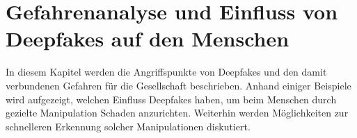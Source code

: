 \section{Gefahrenanalyse und Einfluss von Deepfakes auf den Menschen}
In diesem Kapitel werden die Angriffspunkte von Deepfakes und den damit verbundenen Gefahren für die Gesellschaft beschrieben.
Anhand einiger Beispiele wird aufgezeigt, welchen Einfluss Deepfakes haben, um beim Menschen durch gezielte Manipulation Schaden anzurichten.
Weiterhin werden Möglichkeiten zur schnelleren Erkennung solcher Manipulationen diskutiert.





